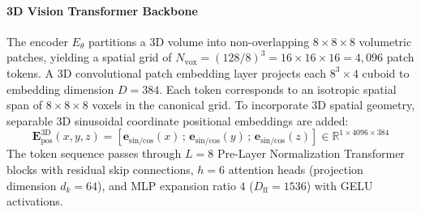 \documentclass{article}
\begin{document}
\paragraph{3D Vision Transformer Backbone}
The encoder $E_\theta$ partitions a 3D volume into non-overlapping $8 \times 8 \times 8$ volumetric patches, yielding a spatial grid of $N_{\text{vox}} = (128 / 8)^3 = 16 \times 16 \times 16 = 4,096$ patch tokens. A 3D convolutional patch embedding layer projects each $8^3 \times 4$ cuboid to embedding dimension $D = 384$. Each token corresponds to an isotropic spatial span of $8 \times 8 \times 8$ voxels in the canonical grid. To incorporate 3D spatial geometry, separable 3D sinusoidal coordinate positional embeddings are added:
\begin{equation}
    \mathbf{E}_{\text{pos}}^{3\text{D}}(x, y, z) = \left[ \mathbf{e}_{\text{sin/cos}}(x) \,;\, \mathbf{e}_{\text{sin/cos}}(y) \,;\, \mathbf{e}_{\text{sin/cos}}(z) \right] \in \mathbb{R}^{1 \times 4096 \times 384}
\end{equation}
The token sequence passes through $L = 8$ Pre-Layer Normalization Transformer blocks with residual skip connections, $h = 6$ attention heads (projection dimension $d_k = 64$), and MLP expansion ratio $4$ ($D_{\text{ff}} = 1536$) with GELU activations.
\end{document}
